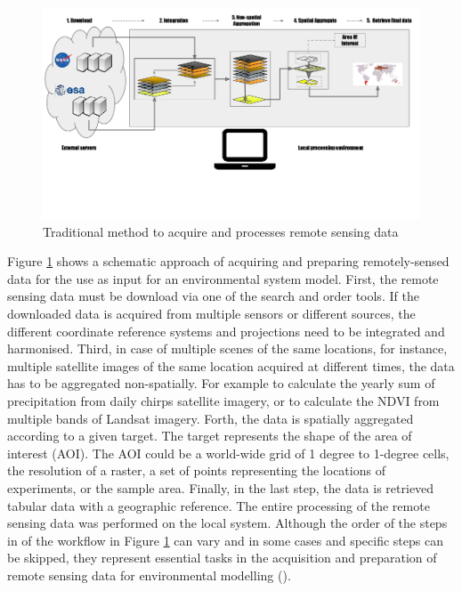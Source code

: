 \documentclass[12pt,twoside,a4paper,final]{report}
\begin{document}
\begin{center}
	\begin{figure}[h]
		\begin{center}
			\includegraphics[width=15cm]{images/traditional_acquisition.pdf}
			\caption{Traditional method to acquire and processes remote sensing data}
			\label{traditionl_approach}
		\end{center}
	\end{figure}
\end{center}


Figure \ref{traditionl_approach} shows a schematic approach of acquiring and preparing remotely-sensed data for the use as input for an environmental system model.
First, the remote sensing data must be download via one of the search and order tools. If the downloaded data is acquired from multiple sensors or different sources, the different coordinate reference systems and projections need to be integrated and harmonised. Third, in case of multiple scenes of the same locations, for instance, multiple satellite images of the same location acquired at different times, the data has to be aggregated non-spatially. For example to calculate the yearly sum of precipitation from daily chirps satellite imagery, or to calculate the NDVI from multiple bands of Landsat imagery.
Forth, the data is spatially aggregated according to a given target. The target represents the shape of the area of interest (AOI). The AOI could be a world-wide grid of 1 degree to 1-degree cells, the resolution of a raster, a set of points representing the locations of experiments, or the sample area. Finally, in the last step, the data is retrieved tabular data with a geographic reference. The entire processing of the remote sensing data was performed on the local system.
Although the order of the steps in of the workflow in Figure \ref{traditionl_approach} can vary and in some cases and specific steps can be skipped, they represent essential tasks in the acquisition and preparation of remote sensing data for environmental modelling (\cite{iosifescu2011geovite}).
\end{document}
